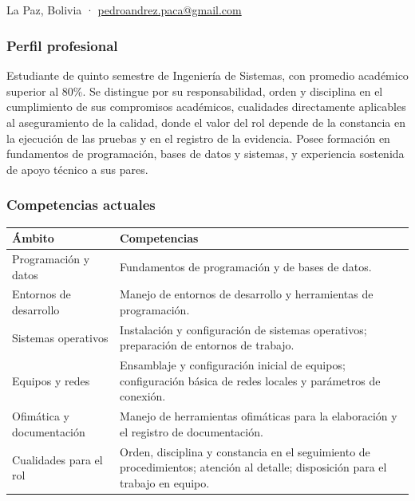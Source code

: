 \subsection{\lgQA}

\begin{nota}[\lgQARol]
La Paz, Bolivia ·
\href{mailto:pedroandrez.paca@gmail.com}{pedroandrez.paca@gmail.com}
\end{nota}

\subsubsection{Perfil profesional}

Estudiante de quinto semestre de Ingeniería de Sistemas, con promedio académico
superior al 80\%. Se distingue por su responsabilidad, orden y disciplina en el
cumplimiento de sus compromisos académicos, cualidades directamente aplicables al
aseguramiento de la calidad, donde el valor del rol depende de la constancia en
la ejecución de las pruebas y en el registro de la evidencia. Posee formación en
fundamentos de programación, bases de datos y sistemas, y experiencia sostenida
de apoyo técnico a sus pares.

\subsubsection{Competencias actuales}

\begin{center}
\begin{tabularx}{\linewidth}{@{}L{4.0cm} Y@{}}
\toprule
\sffamily\bfseries\color{lgPrimario}Ámbito &
\sffamily\bfseries\color{lgPrimario}Competencias \\
\midrule
Programación y datos & Fundamentos de programación y de bases de datos. \\
Entornos de desarrollo & Manejo de entornos de desarrollo y herramientas de programación. \\
Sistemas operativos & Instalación y configuración de sistemas operativos; preparación de entornos de trabajo. \\
Equipos y redes & Ensamblaje y configuración inicial de equipos; configuración básica de redes locales y parámetros de conexión. \\
Ofimática y documentación & Manejo de herramientas ofimáticas para la elaboración y el registro de documentación. \\
Cualidades para el rol & Orden, disciplina y constancia en el seguimiento de procedimientos; atención al detalle; disposición para el trabajo en equipo. \\
\bottomrule
\end{tabularx}
\end{center}

